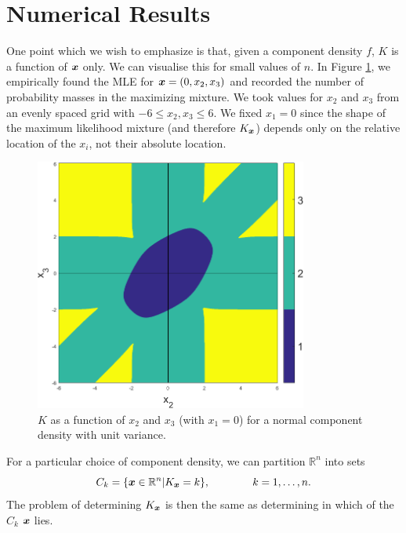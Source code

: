 \section{Numerical Results}


	One point which we wish to emphasize is that, given a component density $f$, $K$ is a function of ${\bm{{x}}}$ only. We can visualise this for small values of $n$. In Figure \ref{fig:n3phase}, we empirically found the MLE for ${\bm{{x}}} = (0,x_2,x_3)$ and recorded the number of probability masses in the maximizing mixture. We took values for $x_2$ and $x_3$ from an evenly spaced grid with $-6\leq x_2,x_3\leq 6$. We fixed $x_1 = 0$ since the shape of the maximum likelihood mixture (and therefore $K_{{\bm{{x}}}}$) depends only on the relative location of the $x_i$, not their absolute location.
	
	\begin{figure}[ht]
		\centering
		\includegraphics[width=0.8\textwidth]{Sigma1n3res1024width6}
		\caption{$K$ as a function of $x_2$ and $x_3$ (with $x_1 = 0$) for a normal component density with unit variance.}\label{fig:n3phase}
	\end{figure}
	
	For a particular choice of component density, we can partition $\mathbb{R}^n$ into sets 
	\begin{equation}
		C_k = \{ {\bm{{x}}} \in \mathbb{R}^n | K_{{\bm{{x}}}} = k \}, \hspace{40pt} k = 1,\dots,n.
	\end{equation}
	The problem of determining $K_{{\bm{{x}}}}$ is then the same as determining in which of the $C_k$ ${\bm{{x}}}$ lies.


